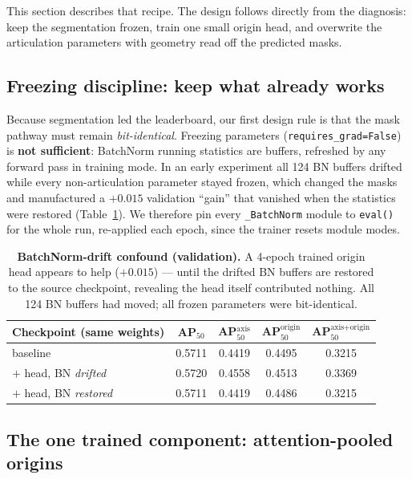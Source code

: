 \documentclass[11pt]{article}
\newcommand{\metric}{AP$_{50}^{\text{axis+origin}}$}
\newcommand{\apfifty}{AP$_{50}$}
\begin{document}
This section describes that recipe. The design
follows directly from the diagnosis: keep the segmentation frozen, train one
small origin head, and overwrite the articulation parameters with geometry
read off the predicted masks.

\subsection{Freezing discipline: keep what already works}
\label{sec:freeze}

Because segmentation led the leaderboard, our first design rule is that the
mask pathway must remain \emph{bit-identical}. Freezing parameters
(\texttt{requires\_grad=False}) is \textbf{not sufficient}: BatchNorm running
statistics are buffers, refreshed by any forward pass in training mode. In an
early experiment all 124 BN buffers drifted while every non-articulation
parameter stayed frozen, which changed the masks and manufactured a
$+0.015$ validation ``gain'' that vanished when the statistics were
restored (Table~\ref{tab:bn}). We therefore
pin every \texttt{\_BatchNorm} module to \texttt{eval()} for the whole run,
re-applied each epoch, since the trainer resets module modes.

\begin{table}[t]
\centering
\small
\begin{tabular}{lcccc}
\toprule
Checkpoint (same weights) & \apfifty{} & AP$_{50}^{\text{axis}}$ & AP$_{50}^{\text{origin}}$ & \metric{} \\
\midrule
baseline                     & 0.5711 & 0.4419 & 0.4495 & 0.3215 \\
$+$ head, BN \emph{drifted}  & 0.5720 & 0.4558 & 0.4513 & 0.3369 \\
$+$ head, BN \emph{restored} & 0.5711 & 0.4419 & 0.4486 & 0.3215 \\
\bottomrule
\end{tabular}
\caption{\textbf{BatchNorm-drift confound (validation).} A 4-epoch trained
origin head appears to help ($+0.015$) --- until the drifted BN buffers are
restored to the source checkpoint, revealing the head itself contributed
nothing. All 124 BN buffers had moved; all frozen parameters were
bit-identical.}
\label{tab:bn}
\end{table}

\subsection{The one trained component: attention-pooled origins}
\label{sec:originhead}
\end{document}
